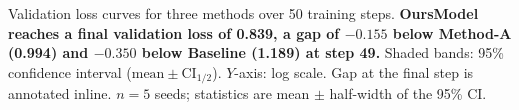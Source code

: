 \caption{Validation loss curves for three methods over 50 training steps.
\textbf{OursModel reaches a final validation loss of 0.839, a gap of $-0.155$ below Method-A (0.994) and $-0.350$ below Baseline (1.189) at step 49.}
Shaded bands: 95\% confidence interval ($\text{mean} \pm \text{CI}_{1/2}$).
$Y$-axis: log scale.
Gap at the final step is annotated inline.
$n = 5$ seeds; statistics are mean $\pm$ half-width of the 95\% CI.}
